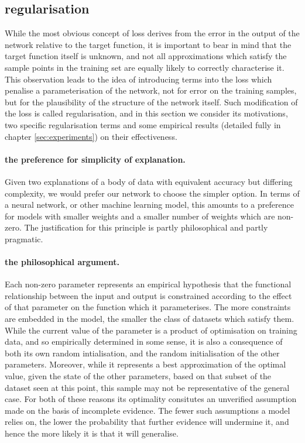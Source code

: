 \documentclass[msc]{infthesis}
\begin{document}
\subsection{regularisation}
\label{sec:classification:2-4}


While the most obvious concept of loss derives from the error in the output of the network relative
to the target function, it is important to bear in mind that the target function itself is unknown,
and not all approximations which satisfy the sample points in the training set are equally likely to
correctly characterise it.  This observation leads to the idea of introducing terms into the loss
which penalise a parameterisation of the network, not for error on the training samples, but for the
plausibility of the structure of the network itself.  Such modification of the loss is called
regularisation, and in this section we consider its motivations, two specific regularisation terms
and some empirical results (detailed fully in chapter \ref{sec:experiments}) on their effectiveness.


\paragraph*{the preference for simplicity of explanation.}
\label{sec:classification:2-4-1-1}
Given two explanations of a body of data with equivalent accuracy but differing complexity, we would
prefer our network to choose the simpler option.  In terms of a neural network, or other machine learning
model, this amounts to a preference for models with smaller weights and a smaller number of weights
which are non-zero.  The justification for this principle is partly philosophical and partly pragmatic.

\paragraph*{the philosophical argument.}
\label{sec:classification:2-4-1-2}
Each non-zero parameter represents an empirical hypothesis that the functional relationship between
the input and output is constrained according to the effect of that parameter on the function which
it parameterises.  The more constraints are embedded in the model, the smaller the class of datasets
which satisfy them.  While the current value of the parameter is a product of optimisation on training
data, and so empirically determined in some sense, it is also a consequence of both its own random
intialisation, and the random initialisation of the other parameters.  Moreover, while it represents
a best approximation of the optimal value, given the state of the other parameters, based on that
subset of the dataset seen at this point, this sample may not be representative of the general case.
For both of these reasons its optimality consitutes an unverified assumption made on the basis of
incomplete evidence.  The fewer such assumptions a model relies on, the lower the probability that 
further evidence will undermine it, and hence the more likely it is that it will generalise.
\end{document}
